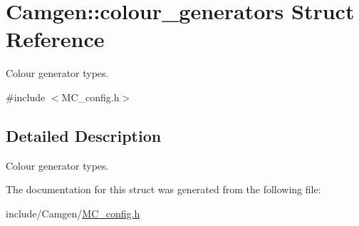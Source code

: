 \hypertarget{a00083}{}\section{Camgen\+:\+:colour\+\_\+generators Struct Reference}
\label{a00083}


Colour generator types.  




{\ttfamily \#include $<$M\+C\+\_\+config.\+h$>$}



\subsection{Detailed Description}
Colour generator types. 

The documentation for this struct was generated from the following file\+:\begin{DoxyCompactItemize}
\item 
include/\+Camgen/\hyperlink{a00690}{M\+C\+\_\+config.\+h}\end{DoxyCompactItemize}
